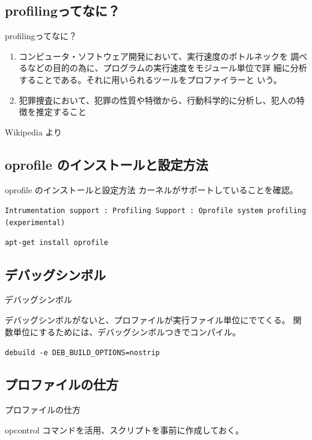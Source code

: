 \documentclass[cjk,dvipdfmx]{beamer}
\begin{document}
\subsection{profilingってなに？}
\begin{frame}{profilingってなに？}
\begin{enumerate}
 \item コンピュータ・ソフトウェア開発において、実行速度のボトルネックを
       調べるなどの目的の為に、プログラムの実行速度をモジュール単位で詳
       細に分析することである。それに用いられるツールをプロファイラーと
       いう。
 \item 犯罪捜査において、犯罪の性質や特徴から、行動科学的に分析し、犯人の特徴を推定すること
\end{enumerate}
Wikipedia より
\end{frame}

\subsection{oprofile のインストールと設定方法}
\begin{frame}{oprofile のインストールと設定方法}
カーネルがサポートしていることを確認。

\texttt{Intrumentation support : Profiling Support :
Oprofile system profiling (experimental)}

\begin{center}
 \texttt{apt-get install oprofile}
\end{center}
\end{frame}


\subsection{デバッグシンボル}
\begin{frame}{デバッグシンボル}

デバッグシンボルがないと、プロファイルが実行ファイル単位にでてくる。
関数単位にするためには、デバッグシンボルつきでコンパイル。

\texttt{debuild -e DEB\_BUILD\_OPTIONS=nostrip}

\end{frame}

\subsection{プロファイルの仕方}
\begin{frame}{プロファイルの仕方}

opcontrol コマンドを活用、スクリプトを事前に作成しておく。

\end{frame}
\end{document}
